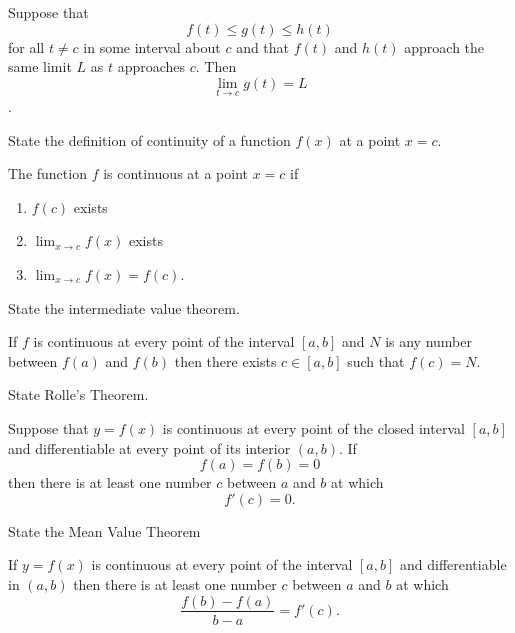 \begin{questions}
\begin{solution}
        \begin{theorem} Suppose that $$f(t) \le g(t) \le h(t)$$ for
        all $t \ne c$ in some interval about $c$ and that $f(t)$ and
        $h(t)$ approach the same limit $L$ as $t$ approaches
        $c$. Then $$\lim_{t \to c} g(t) = L$$.
        \end{theorem}
    \end{solution}

    \question[1] State the definition of continuity of a function
    $f(x)$ at a point $x = c$.
    \begin{solution}
        \begin{definition}
        The function $f$ is continuous at a point $x = c$ if
        \begin{enumerate}
        \item $f(c)$ exists
        \item $\lim_{x \to c} f(x)$ exists
        \item $\lim_{x \to c} f(x) = f(c)$.
        \end{enumerate}
        \end{definition}
    \end{solution}

    \question[1] State the intermediate value theorem.
    \begin{solution}   
        \begin{theorem}
            If $f$ is continuous at every point of the interval $[a,
            b]$ and $N$ is any number between $f(a)$ and $f(b)$ then
            there exists $c \in [a, b]$ such that $f(c) = N$.
        \end{theorem}
    \end{solution}

    \question[1] State Rolle's Theorem.
    \begin{solution}
        \begin{theorem}
            Suppose that $y = f(x)$ is continuous at every point of
            the closed interval $[a, b]$ and differentiable at every
            point of its interior $(a, b)$. If 
            $$f(a) = f(b) = 0$$
            then there is at least one number $c$ between $a$ and $b$
            at which $$f'(c) = 0.$$
        \end{theorem}
    \end{solution}

    \question[1] State the Mean Value Theorem
    \begin{solution}
        \begin{theorem}
            If $y = f(x)$ is continuous at every point of the interval
            $[a, b]$ and differentiable in $(a, b)$ then there is at
            least one number $c$ between $a$ and $b$ at which 
            $$\frac{f(b) - f(a)}{b - a} = f'(c).$$
        \end{theorem}
    \end{solution}


\end{questions}
